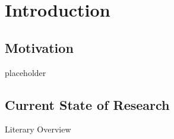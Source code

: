 \section{Introduction}
	\subsection{Motivation}
		{\color{red} \Large placeholder}
	\subsection{Current State of Research}
		{\color{red} \Large Literary Overview}
	